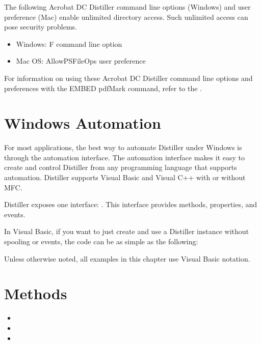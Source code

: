 \documentclass[letterpaper,12pt,english,openany,oneside]{sphinxmanual}
\begin{document}
The following Acrobat DC Distiller command line options (Windows) and user preference (Mac) enable unlimited directory access. Such unlimited access can pose security problems.
\begin{itemize}
\item {} 
Windows: \sphinxhyphen{}F command line option

\item {} 
Mac OS: AllowPSFileOps user preference

\end{itemize}

For information on using these Acrobat DC Distiller command line options and preferences with the EMBED pdfMark command, refer to the  .




\section{Windows Automation}
\label{\detokenize{Distiller_AutomationIntro:windows-automation}}
For most applications, the best way to automate Distiller under Windows is through the automation interface. The automation interface makes it easy to create and control Distiller from any programming language that supports automation. Distiller supports Visual Basic and Visual C++ with or without MFC.

Distiller exposes one interface:  . This interface provides methods, properties, and events.

In Visual Basic, if you want to just create and use a Distiller instance without spooling or events, the code can be as simple as the following:

\begin{sphinxVerbatim}[commandchars=\\\{\}]
   
    
\end{sphinxVerbatim}

Unless otherwise noted, all examples in this chapter use Visual Basic notation.




\section{Methods}
\label{\detokenize{Distiller_AutomationIntro:methods}}\begin{itemize}
\item {} 

\item {} 

\item {} 

\end{itemize}
\end{document}
